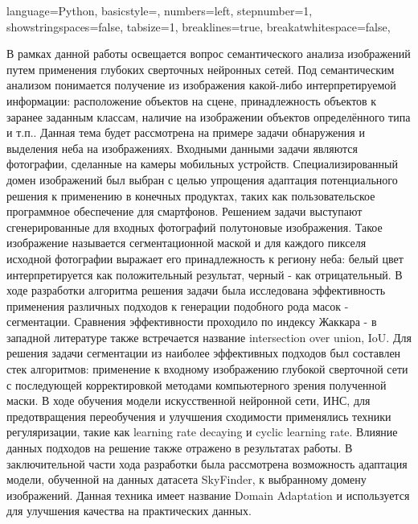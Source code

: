 \usepackage{amsmath}
\usepackage{cleveref}
\usepackage[toc,page]{appendix}
\usepackage{listings}




\lstset
{ %
    language=Python,
    basicstyle=\footnotesize,
    numbers=left,
    stepnumber=1,
    showstringspaces=false,
    tabsize=1,
    breaklines=true,
    breakatwhitespace=false,
}



\Intro

В рамках данной работы освещается вопрос семантического анализа изображений путем применения глубоких сверточных нейронных сетей.
Под семантическим анализом понимается получение из изображения какой-либо интерпретируемой информации: расположение объектов на сцене,
принадлежность объектов к заранее заданным классам, наличие на изображении объектов определённого типа и т.п..
Данная тема будет рассмотрена на примере задачи обнаружения и выделения неба на изображениях.
Входными данными задачи являются фотографии, сделанные на камеры мобильных устройств.
Специализированный домен изображений был выбран с целью упрощения адаптация потенциального решения к применению в конечных продуктах,
таких как пользовательское программное обеспечение для смартфонов.
Решением задачи выступают сгенерированные для входных фотографий полутоновые изображения.
Такое изображение называется сегментационной маской и для каждого пикселя исходной фотографии выражает его принадлежность
к региону неба: белый цвет интерпретируется как положительный результат, черный - как отрицательный.
В ходе разработки алгоритма решения задачи была исследована эффективность применения различных подходов к генерации подобного рода масок - сегментации.
Сравнения эффективности проходило по индексу Жаккара - в западной литературе также встречается название intersection over union, IoU\@.
Для решения задачи сегментации из наиболее эффективных подходов был составлен стек алгоритмов: применение к входному изображению глубокой сверточной сети
с последующей корректировкой методами компьютерного зрения полученной маски.
В ходе обучения модели искусственной нейронной сети, ИНС, для предотвращения переобучения и улучшения сходимости
применялись техники регуляризации, такие как learning rate decaying и cyclic learning rate.
Влияние данных подходов на решение также отражено в результатах работы.
В заключительной части хода разработки была рассмотрена возможность адаптация модели, обученной на данных датасета SkyFinder,
к выбранному домену изображений.
Данная техника имеет название Domain Adaptation и используется для улучшения качества на практических данных.

